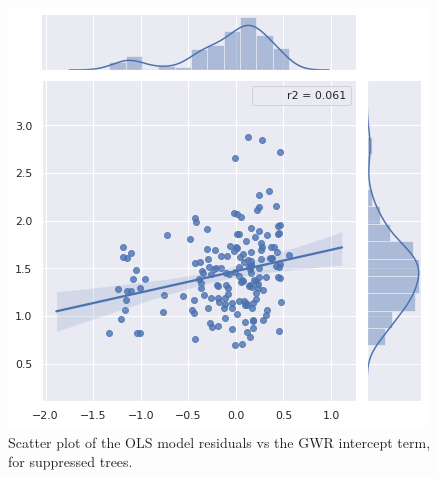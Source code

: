\documentclass[12pt,a4paper]{article}
\begin{document}
\begin{figure}[H]
\centering
\includegraphics[scale=.65]{../figures/ModelComparison_Cnpy=6.png}
\caption{Scatter plot of the OLS model residuals vs the GWR intercept term, for suppressed trees.}
\label{ModelComparison_Cnpy6} 
\end{figure}




\newpage


\end{document}
